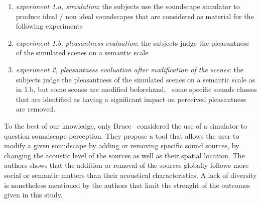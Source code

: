 \documentclass[twoside,twocolumn]{article}
\begin{document}
\begin{enumerate}
\item \emph{experiment 1.a, simulation}:  the subjects use the soundscape simulator to produce ideal / non ideal soundscapes that are considered as material for the following experiments
\item \emph{experiment 1.b, pleasantness evaluation}: the subjects judge the pleasantness of the simulated scenes on a semantic scale
\item \emph{experiment 2, pleasantness evaluation after modification of the scenes}: the subjects judge the pleasantness of the simulated scenes on a semantic scale as in 1.b, but some scenes are modified beforehand, \ie~some specific sounds classes that are identified as having a significant impact on perceived pleasantness are removed.
\end{enumerate}


To the best of our knowledge, only Bruce~\al \cite{bruce2009development,bruce2014effects} considered the use of a simulator to question soundscape perception. They propose a tool that allows the user to modify a given soundscape by adding or removing specific sound sources, by changing the acoustic level of the sources as well as their spatial location. The authors shows that the addition or removal of the sources globally follows more social or semantic matters than their acoustical characteristics. A lack of diversity is nonetheless mentioned by the authors that limit the strenght of the outcomes given in this study.

\end{document}
